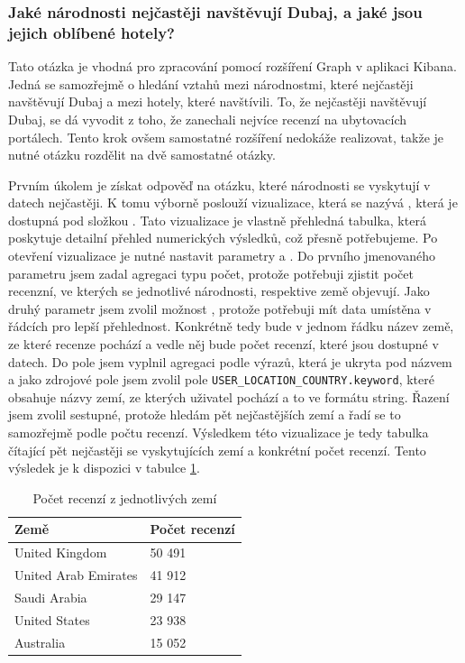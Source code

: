 \documentclass[czech,BP]{thesiskiv}
\begin{document}
\subsubsection{Jaké národnosti nejčastěji navštěvují Dubaj, a jaké jsou jejich oblíbené hotely?}
\label{subsub:Národnosti}
Tato otázka je vhodná pro zpracování pomocí rozšíření Graph v aplikaci Kibana. Jedná se samozřejmě o hledání vztahů mezi národnostmi, které nejčastěji navštěvují Dubaj a mezi hotely, které navštívili. To, že nejčastěji navštěvují Dubaj, se dá vyvodit z toho, že zanechali nejvíce recenzí na ubytovacích portálech. Tento krok ovšem samostatné rozšíření nedokáže realizovat, takže je nutné otázku rozdělit na dvě samostatné otázky.

Prvním úkolem je získat odpověď na otázku, které národnosti se vyskytují v datech nejčastěji. K tomu výborně poslouží vizualizace, která se nazývá , která je dostupná pod složkou . Tato vizualizace je vlastně přehledná tabulka, která poskytuje detailní přehled numerických výsledků, což přesně potřebujeme. Po otevření vizualizace je nutné nastavit parametry  a . Do prvního jmenovaného parametru jsem zadal agregaci typu počet, protože potřebuji zjistit počet recenzní, ve kterých se jednotlivé národnosti, respektive země objevují. Jako druhý parametr jsem zvolil možnost , protože potřebuji mít data umístěna v řádcích pro lepší přehlednost. Konkrétně tedy bude v jednom řádku název země, ze které recenze pochází a vedle něj bude počet recenzí, které jsou dostupné v datech. Do pole  jsem vyplnil agregaci podle výrazů, která je ukryta pod názvem  a jako zdrojové pole jsem zvolil pole \texttt{USER\_LOCATION\_COUNTRY.keyword}, které obsahuje názvy zemí, ze kterých uživatel pochází a to ve formátu string. Řazení jsem zvolil sestupné, protože hledám pět nejčastějších zemí a řadí se to samozřejmě podle počtu recenzí. Výsledkem této vizualizace je tedy tabulka čítající pět nejčastěji se vyskytujících zemí a konkrétní počet recenzí. Tento výsledek je k dispozici v tabulce \ref{Pocet_zeme}.

\begin{table}[ht]
	\centering
	\begin{tabular}{l|l}
		\hline
		\textbf{Země}        & \textbf{Počet recenzí} \\ \hline
		United Kingdom       & 50 491                 \\ 
		United Arab Emirates & 41 912                 \\ 
		Saudi Arabia         & 29 147                 \\ 
		United States        & 23 938                 \\ 
		Australia            & 15 052                 \\ \hline
	\end{tabular}
	\caption{Počet recenzí z jednotlivých zemí}
	\label{Pocet_zeme}
\end{table}
\end{document}
